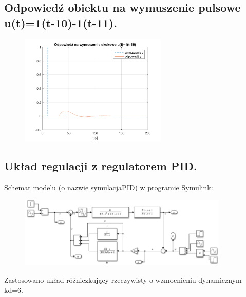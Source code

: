 \documentclass[a4paper]{article}
\begin{document}
\subsection{Odpowiedź obiektu na wymuszenie pulsowe u(t)=1(t-10)-1(t-11).}
\begin{figure}[H]
	\centering
	\includegraphics[width=7cm]{pkt2} 
\end{figure}

\subsection{Układ regulacji z regulatorem PID.}
Schemat modelu (o nazwie symulacjaPID) w programie Symulink:
\begin{figure}[H]
	\centering
	\includegraphics[width=10cm]{modelsymulacjaPID} 
\end{figure}
Zastosowano układ różniczkujący rzeczywisty o wzmocnieniu dynamicznym kd=6.
\end{document}

